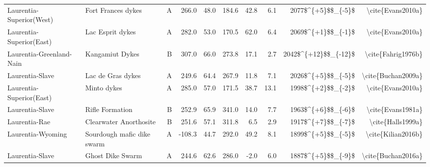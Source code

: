 \begin{longtable}{p{1 in}p{1 in}rrrrrrrr}
      Laurentia-Superior(West) &                               Fort Frances dykes &      A &     266.0 &      48.0 & 184.6 &  42.8 &       6.1 &     2077\$\textasciicircum \{+5\}\$\$\_\{-5\}\$ &                                  \textbackslash cite\{Evans2010a\} \\
      Laurentia-Superior(East) &                                 Lac Esprit dykes &      A &     282.0 &      53.0 & 170.5 &  62.0 &       6.4 &     2069\$\textasciicircum \{+1\}\$\$\_\{-1\}\$ &                                  \textbackslash cite\{Evans2010a\} \\
      Laurentia-Greenland-Nain &                                  Kangamiut Dykes &      B &     307.0 &      66.0 & 273.8 &  17.1 &       2.7 &   2042\$\textasciicircum \{+12\}\$\$\_\{-12\}\$ &                                 \textbackslash cite\{Fahrig1976b\} \\
               Laurentia-Slave &                                Lac de Gras dykes &      A &     249.6 &      64.4 & 267.9 &  11.8 &       7.1 &     2026\$\textasciicircum \{+5\}\$\$\_\{-5\}\$ &                                 \textbackslash cite\{Buchan2009a\} \\
      Laurentia-Superior(East) &                                      Minto dykes &      A &     285.0 &      57.0 & 171.5 &  38.7 &      13.1 &     1998\$\textasciicircum \{+2\}\$\$\_\{-2\}\$ &                                  \textbackslash cite\{Evans2010a\} \\
               Laurentia-Slave &                                  Rifle Formation &      B &     252.9 &      65.9 & 341.0 &  14.0 &       7.7 &     1963\$\textasciicircum \{+6\}\$\$\_\{-6\}\$ &                                  \textbackslash cite\{Evans1981a\} \\
                 Laurentia-Rae &                           Clearwater Anorthosite &      B &     251.6 &      57.1 & 311.8 &   6.5 &       2.9 &     1917\$\textasciicircum \{+7\}\$\$\_\{-7\}\$ &                                  \textbackslash cite\{Halls1999a\} \\
             Laurentia-Wyoming &                       Sourdough mafic dike swarm &      A &    -108.3 &      44.7 & 292.0 &  49.2 &       8.1 &     1899\$\textasciicircum \{+5\}\$\$\_\{-5\}\$ &                                 \textbackslash cite\{Kilian2016b\} \\
               Laurentia-Slave &                                 Ghost Dike Swarm &      A &     244.6 &      62.6 & 286.0 &  -2.0 &       6.0 &     1887\$\textasciicircum \{+5\}\$\$\_\{-9\}\$ &                                 \textbackslash cite\{Buchan2016a\} \\

\end{longtable}
